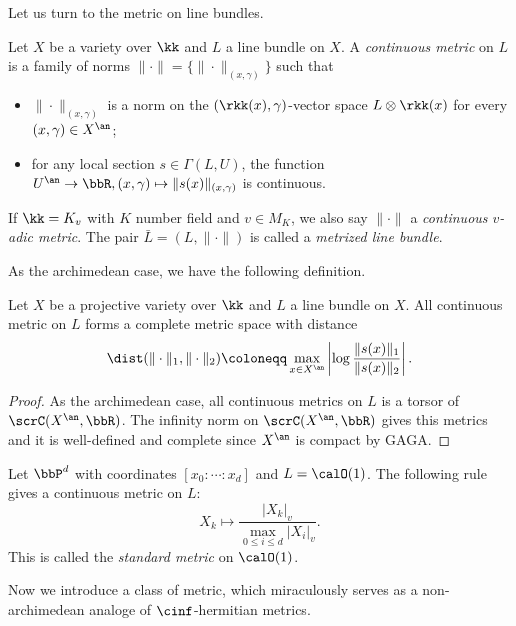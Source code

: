 Let us turn to the metric on line bundles.

\begin{definition}[label=\labelNFM{def:adic-metric}, status=draft, tag=0000000]
	Let $X$ be a variety over $\kk$ and $L$ a line bundle on $X$.
	A \emph{continuous metric} on $L$ is a family of norms $\|\cdot\| = \{\|\cdot\|_{(x,\gamma)}\}$ such that
	\begin{itemize}
		\item $\|\cdot\|_{(x,\gamma)}$ is a norm on the $(\rkk(x),\gamma)$-vector space $L\otimes \rkk(x)$ for every $(x,\gamma) \in X^\an$;
		\item for any local section $s \in \Gamma(L,U)$, the function $U^\an \to \bbR, (x,\gamma) \mapsto \|s(x)\|_{(x,\gamma)}$ is continuous.
	\end{itemize}
	If $\kk = K_v$ with $K$ number field and $v \in M_K$, we also say $\|\cdot\|$ a \emph{continuous $v$-adic metric}.
	The pair $\bar L = (L,\|\cdot\|)$ is called a \emph{metrized line bundle}.
\end{definition}

As the archimedean case, we have the following definition.

\begin{lemma}[label=\labelNFM{lem:distance-of-two-non-archimead-metrics}, status=draft, tag=0000000]
	Let $X$ be a projective variety over $\kk$ and $L$ a line bundle on $X$.
	All continuous metric on $L$ forms a complete metric space with distance
	\[ \dist(\|\cdot\|_1, \|\cdot\|_2) \coloneqq \max_{x \in X^\an} \left| \log \frac{\|s(x)\|_1}{\|s(x)\|_2} \right|. \]
\end{lemma}
\begin{proof}
	As the archimedean case, all continuous metrics on $L$ is a torsor of $\scrC(X^\an,\bbR)$.
	The infinity norm on $\scrC(X^\an,\bbR)$ gives this metrics and it is well-defined and complete since $X^\an$ is compact by GAGA.
\end{proof}


\begin{example}[label=\labelNFM{eg:standard-metrics-on-projective-space}, status=draft, tag=0000000]
	Let $\bbP^d$ with coordinates $[x_0:\cdots:x_d]$ and $L = \calO(1)$.
	The following rule gives a continuous metric on $L$:
	\[ X_k \mapsto \frac{|X_k|_v}{\max_{0 \leq i \leq d}|X_i|_v}. \]
	This is called the \emph{standard metric} on $\calO(1)$.
\end{example}

Now we introduce a class of metric, which miraculously serves as a non-archimedean analoge of $\cinf$-hermitian metrics.

